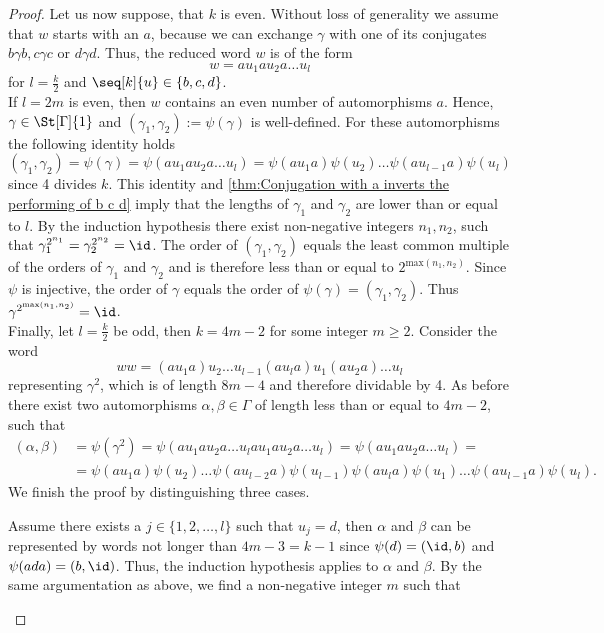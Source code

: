 \begin{proof}
Let us now suppose, that $k$ is even. Without loss of generality we assume that $w$ starts with an $a$, because we can exchange $\gamma$ with one of its conjugates $b\gamma b, c\gamma c$ or $d\gamma d$. Thus, the reduced word $w$ is of the form
\begin{equation*}
w=au_1 a u_2 a\ldots u_l
\end{equation*}
for $l=\frac{k}{2}$ and $\seq[k]{u}\in\lbrace b,c,d\rbrace$.\\
If $l=2m$ is even, then $w$ contains an even number of automorphisms $a$. Hence, $\gamma\in\St[\Gamma]{1}$ and $(\gamma_1,\gamma_2):=\psi(\gamma)$ is well-defined. For these automorphisms the following identity holds
\begin{equation*}
(\gamma_1,\gamma_2)=\psi(\gamma)=\psi(au_1 a u_2 a\ldots u_l)=\psi(au_1 a)\psi(u_2)\ldots\psi(au_{l-1}a)\psi(u_l)
\end{equation*}
since 4 divides $k$. This identity and \cref{thm:Conjugation with a inverts the performing of b c d} imply that the lengths of $\gamma_1$ and $\gamma_2$ are lower than or equal to $l$. By the induction hypothesis there exist non-negative integers $n_1,n_2$, such that $\gamma_1^{2^{n_1}}=\gamma_2^{2^{n_2}}=\id$. The order of $(\gamma_1,\gamma_2)$ equals the least common multiple of the orders of $\gamma_1$ and $\gamma_2$ and is therefore less than or equal to $2^{\mathrm{max}(n_1,n_2)}$. Since $\psi$ is injective, the order of $\gamma$ equals the order of $\psi(\gamma)=(\gamma_1,\gamma_2)$. Thus $\gamma^{2^{\mathrm{max}(n_1,n_2)}}=\id$.\\
Finally, let $l=\frac{k}{2}$ be odd, then $k=4m-2$ for some integer $m\geq 2$. Consider the word
\begin{equation*}
ww=(au_1 a) u_2 \ldots u_{l-1}(au_la)u_1 (a u_2 a)\ldots u_l
\end{equation*}
representing $\gamma^2$, which is of length $8m-4$ and therefore dividable by 4. As before there exist two automorphisms $\alpha,\beta\in\Gamma$ of length less than or equal to $4m-2$, such that
\begin{align*}
(\alpha,\beta)&=\psi(\gamma^2)=\psi(au_1 a u_2 a\ldots u_lau_1 a u_2 a\ldots u_l)=\psi(au_1 a u_2 a\ldots u_l)=\\
&=\psi(au_1 a)\psi(u_2)\ldots\psi(au_{l-2}a)\psi(u_{l-1})\psi(au_l a)\psi(u_1)\ldots\psi(au_{l-1}a)\psi(u_l).
\end{align*}
We finish the proof by distinguishing three cases.
\begin{clist}
\item \label{p:Gamma is 2-group 1} Assume there exists a $j\in\lbrace 1,2,\ldots,l\rbrace$ such that $u_j=d$, then $\alpha$ and $\beta$ can be represented by words not longer than $4m-3=k-1$ since $\psi(d)=(\id,b)$ and $\psi(ada)=(b,\id)$. Thus, the induction hypothesis applies to $\alpha$ and $\beta$. By the same argumentation as above, we find a non-negative integer $m$ such that 

\end{clist}
\end{proof}

